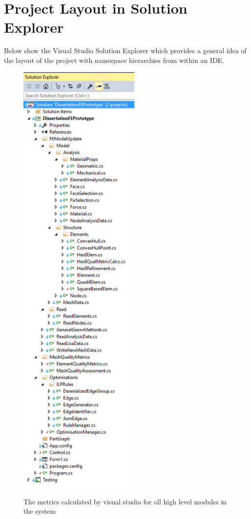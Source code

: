 \section{Project Layout in Solution Explorer}
Below show the Visual Studio Solution Explorer which provides a general idea of the layout of the project with namespace hierarchies from within an IDE.

\begin{figure}[h!!]
  \centerline{\includegraphics[width=60mm, scale=0.5]{../Graphics/VSolutionExplorer.png}}
  \caption{The metrics calculated by visual studio for all high level modules in the system}
\end{figure}


